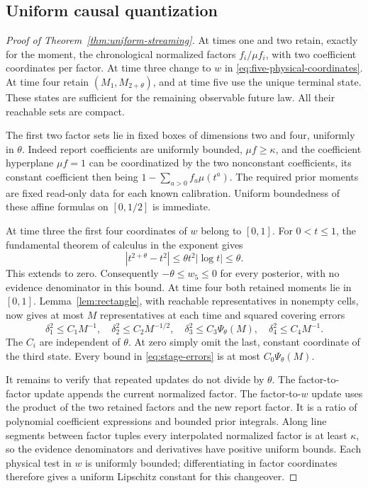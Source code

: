 \subsection{Uniform causal quantization}
\begin{proof}[Proof of Theorem~\ref{thm:uniform-streaming}]
At times one and two retain, exactly for the moment, the chronological
normalized factors $f_i/\mu f_i$, with two coefficient coordinates per
factor. At time three change to $w$ in
\eqref{eq:five-physical-coordinates}. At time four retain
$(M_1,M_{2+\theta})$, and at time five use the unique terminal state.
These states are sufficient for the remaining observable future law.
All their reachable sets are compact.

The first two factor sets lie in fixed boxes of dimensions two and four,
uniformly in $\theta$. Indeed report coefficients are uniformly bounded,
$\mu f\ge\kappa$, and the coefficient hyperplane $\mu f=1$ can be
coordinatized by the two nonconstant coefficients, its constant coefficient
then being $1-\sum_{a>0}f_a\mu(t^a)$. The required prior moments are
fixed read-only data for each known calibration. Uniform boundedness of
these affine formulas on $[0,1/2]$ is immediate.

At time three the first four coordinates of $w$ belong to $[0,1]$.
For $0<t\le1$, the fundamental theorem of calculus in the exponent gives
\[
 |t^{2+\theta}-t^2|
   \le\theta t^2|\log t|\le\theta.
\]
This extends to zero. Consequently $-\theta\le w_5\le0$ for every
posterior, with no evidence denominator in this bound. At time four
both retained moments lie in $[0,1]$. Lemma~\ref{lem:rectangle}, with
reachable representatives in nonempty cells, now gives at most $M$
representatives at each time and squared covering errors
\begin{equation}\label{eq:stage-errors}
 \delta_1^2\le C_1M^{-1},\quad
 \delta_2^2\le C_2M^{-1/2},\quad
 \delta_3^2\le C_3\Psi_\theta(M),\quad
 \delta_4^2\le C_4M^{-1}.
\end{equation}
The $C_i$ are independent of $\theta$. At zero simply omit the last,
constant coordinate of the third state. Every bound in
\eqref{eq:stage-errors} is at most $C_0\Psi_\theta(M)$.

It remains to verify that repeated updates do not divide by $\theta$.
The factor-to-factor update appends the current normalized factor. The
factor-to-$w$ update uses the product of the two retained factors and the
new report factor. It is a ratio of polynomial coefficient expressions
and bounded prior integrals. Along line segments between factor tuples
every interpolated normalized factor is at least $\kappa$, so the evidence
denominators and derivatives have positive uniform bounds. Each physical
test in $w$ is uniformly bounded; differentiating in factor coordinates
therefore gives a uniform Lipschitz constant for this changeover.


\end{proof}

